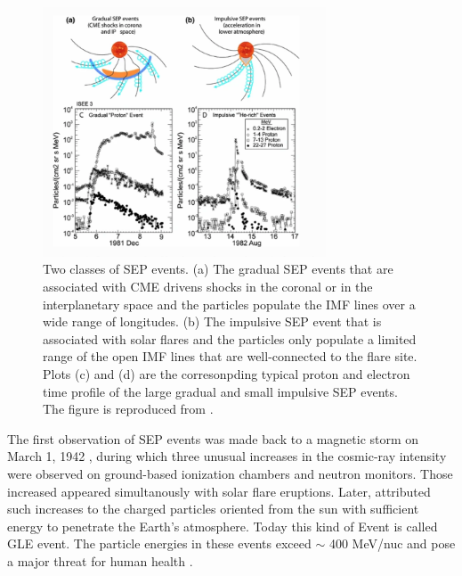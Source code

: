 \begin{figure}[!htb]
	\centering
	\includegraphics[width = 0.75\textwidth]{images/SEP_two_type.png}
	\caption[Two types of Solar energetic particle (SEP) event]{Two classes of \ac{SEP} events. (a) The gradual \ac{SEP} events that are associated with \ac{CME} drivens shocks in the coronal or in the interplanetary space and the particles populate the \ac{IMF} lines over a wide range of longitudes. (b) The impulsive SEP event that is associated with solar flares and the particles only populate a limited range of the open \ac{IMF} lines that are well-connected to the flare site. Plots (c) and (d) are the corresonpding typical proton and electron time profile of the large gradual and small impulsive SEP events. The figure is reproduced from \citet{Desai_Diacalone2016LRSP}.}
	\label{Fig:two_type_SEP}
\end{figure}
The first observation of \ac{SEP} events was made back to a magnetic storm on March 1, 1942 \citep{lange1942note,forbush1942further}, during which three unusual increases in the cosmic-ray intensity were observed on ground-based ionization chambers and neutron monitors. Those increased appeared simultanously with solar flare eruptions. Later, \citet{Forbush1946} attributed such increases to the charged particles oriented from the sun with sufficient energy to penetrate the Earth's atmosphere. Today this kind of Event is called \ac{GLE} event. The particle energies in these events exceed $\sim$ 400 MeV/nuc and pose a major threat for human health \citep{meyer1956solar,Shea2012SSRv,gopalswamy2013first,thakur2014ground, Reames2013, Mironshnichenko2013Ge}.

